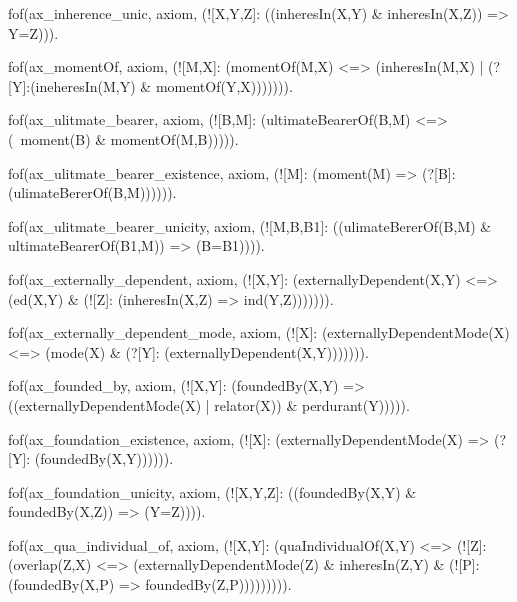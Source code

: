         fof(ax_inherence_unic, axiom, (![X,Y,Z]: ((inheresIn(X,Y) & inheresIn(X,Z)) => Y=Z))).



fof(ax_momentOf, axiom, (![M,X]: (momentOf(M,X) <=> (inheresIn(M,X) | (?[Y]:(ineheresIn(M,Y) & momentOf(Y,X))))))).

fof(ax_ulitmate_bearer, axiom, (![B,M]: (ultimateBearerOf(B,M) <=> (~moment(B) & momentOf(M,B))))).

fof(ax_ulitmate_bearer_existence, axiom, (![M]: (moment(M) => (?[B]: (ulimateBererOf(B,M)))))).

fof(ax_ulitmate_bearer_unicity, axiom, (![M,B,B1]: ((ulimateBererOf(B,M) & ultimateBearerOf(B1,M)) => (B=B1)))).






fof(ax_externally_dependent, axiom, (![X,Y]: (externallyDependent(X,Y) <=>
                                        (ed(X,Y) & (![Z]: (inheresIn(X,Z) => ind(Y,Z))))))).


fof(ax_externally_dependent_mode, axiom, (![X]: (externallyDependentMode(X) <=> (mode(X) & (?[Y]: (externallyDependent(X,Y))))))).



fof(ax_founded_by, axiom, (![X,Y]: (foundedBy(X,Y) => ((externallyDependentMode(X) | relator(X)) & perdurant(Y))))).

fof(ax_foundation_existence, axiom, (![X]: (externallyDependentMode(X) => (?[Y]: (foundedBy(X,Y)))))).

fof(ax_foundation_unicity, axiom, (![X,Y,Z]: ((foundedBy(X,Y) & foundedBy(X,Z)) => (Y=Z)))).


fof(ax_qua_individual_of, axiom, (![X,Y]: (quaIndividualOf(X,Y) <=>
                                      (![Z]:(overlap(Z,X) <=>
                                            (externallyDependentMode(Z) & inheresIn(Z,Y) &
                                            (![P]: (foundedBy(X,P) => foundedBy(Z,P))))))))).

